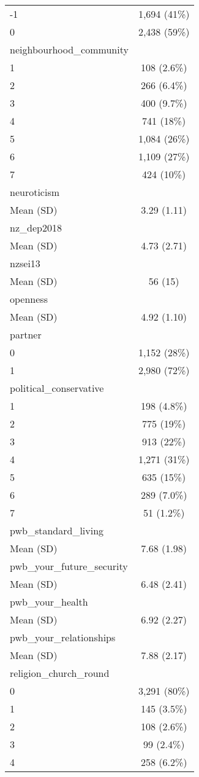 \documentclass[
  singlecolumn,
  9pt]{article}
\begin{document}
\begin{table}
{\begin{longtable}[]{@{}lc@{}}
-1 & 1,694 (41\%) \\
0 & 2,438 (59\%) \\
neighbourhood\_community & \\
1 & 108 (2.6\%) \\
2 & 266 (6.4\%) \\
3 & 400 (9.7\%) \\
4 & 741 (18\%) \\
5 & 1,084 (26\%) \\
6 & 1,109 (27\%) \\
7 & 424 (10\%) \\
neuroticism & \\
Mean (SD) & 3.29 (1.11) \\
nz\_dep2018 & \\
Mean (SD) & 4.73 (2.71) \\
nzsei13 & \\
Mean (SD) & 56 (15) \\
openness & \\
Mean (SD) & 4.92 (1.10) \\
partner & \\
0 & 1,152 (28\%) \\
1 & 2,980 (72\%) \\
political\_conservative & \\
1 & 198 (4.8\%) \\
2 & 775 (19\%) \\
3 & 913 (22\%) \\
4 & 1,271 (31\%) \\
5 & 635 (15\%) \\
6 & 289 (7.0\%) \\
7 & 51 (1.2\%) \\
pwb\_standard\_living & \\
Mean (SD) & 7.68 (1.98) \\
pwb\_your\_future\_security & \\
Mean (SD) & 6.48 (2.41) \\
pwb\_your\_health & \\
Mean (SD) & 6.92 (2.27) \\
pwb\_your\_relationships & \\
Mean (SD) & 7.88 (2.17) \\
religion\_church\_round & \\
0 & 3,291 (80\%) \\
1 & 145 (3.5\%) \\
2 & 108 (2.6\%) \\
3 & 99 (2.4\%) \\
4 & 258 (6.2\%) \\

\end{longtable}}
\end{table}
\end{document}
